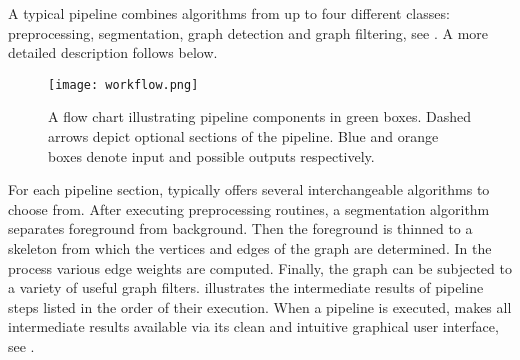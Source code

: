 	A typical pipeline combines algorithms from up to four different classes: preprocessing, segmentation, graph detection and graph filtering, see . A more detailed description follows below. 
	
	\begin{figure}
		\centering
		\texttt{[image: workflow.png]}
		\caption[\NEFIs pipeline concept]{A flow chart illustrating \NEFIs pipeline components in green boxes. Dashed arrows depict optional sections of the pipeline. Blue and orange boxes denote \NEFIs input and possible outputs respectively.}
		\label{fig:workflow}
	\end{figure}

	For each pipeline section, \NEFI typically offers several interchangeable algorithms to choose from. After executing preprocessing routines, a segmentation algorithm separates foreground from background. Then the foreground is thinned to a skeleton from which the vertices and edges of the graph are determined. In the process various edge weights are computed. Finally, the graph can be subjected to a variety of useful graph filters.  illustrates the intermediate results of \NEFIs pipeline steps listed in the order of their execution. When a pipeline is executed, \NEFI makes all intermediate results available via its clean and intuitive graphical user interface, see . 


